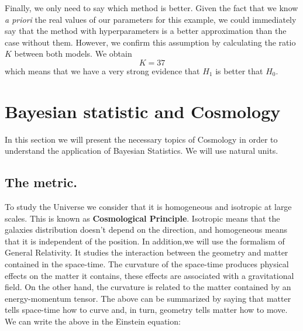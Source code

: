 \documentclass[onecolumn,           %
               showpacs,            %
               preprintnumbers,     %
               aps,                 %
               prl,          	    %
               letterpaper,             %
               superscriptaddress,      %
               nofootinbib,         %
               tightenlines,        %
               floats,floatfix      %
               ,usenatbib,
               ]{revtex4-1}
\begin{document}
Finally, we only need to say which method is better. Given the fact that we know \textit{a priori} the real values of our parameters for this example, we could immediately say that the method with hyperparameters is a better approximation than the case without them. However, we confirm this assumption by calculating the ratio $K$ between both models. We obtain
\begin{equation}
K = 37
\end{equation}
which means that we have a very strong evidence that $H_1$ is better that $H_0$.

\section{Bayesian statistic and Cosmology}



In this section we will present the necessary topics of Cosmology in order to understand the application of Bayesian Statistics. We will use natural units.

\subsection{The metric.}
To study the Universe we consider that it is homogeneous and isotropic at large scales. This is known as \textbf{Cosmological Principle}. Isotropic means that the galaxies distribution doesn't depend on the direction, and homogeneous means that it is independent of the position. In addition,we will use the formalism of General Relativity. It studies the interaction between the geometry and matter contained in the space-time. The curvature of the space-time produces physical effects on the matter it contains, these effects are associated with a gravitational field. On the other hand, the curvature is related to the matter contained by an energy-momentum tensor. The above can be summarized by saying that matter tells space-time how to curve and, in turn, geometry tells matter how to move. We can write the above in the Einstein equation:
\end{document}
